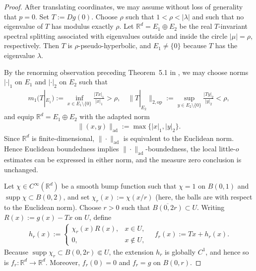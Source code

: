 \documentclass{article}
\begin{document}
\begin{proof}
After translating coordinates, we may assume without loss of generality that
$p=0$. Set $T:=Dg(0)$. Choose $\rho$ such that $1<\rho<|\lambda|$ and such
that no eigenvalue of $T$ has modulus exactly $\rho$. Let
$\mathbb R^d=E_1\oplus E_2$ be the real $T$-invariant spectral splitting
associated with eigenvalues outside and inside the circle $|\mu|=\rho$,
respectively. Then $T$ is $\rho$-pseudo-hyperbolic, and
$E_1\neq\{0\}$ because $T$ has the eigenvalue $\lambda$.

By the renorming observation preceding Theorem~5.1 in
\citet[p.~53]{hirsch1977invariant}, we may choose norms $|\cdot|_1$ on $E_1$
and $|\cdot|_2$ on $E_2$ such that
\begin{align}
    m_1(T|_{E_1})
    :={}
    \inf_{x\in E_1\setminus\{0\}}
    \frac{|Tx|_1}{|x|_1}
    >\rho,\quad
    \|T|_{E_2}\|_{2,\mathrm{op}}
    :={}
    \sup_{y\in E_2\setminus\{0\}}
    \frac{|Ty|_2}{|y|_2}
    <\rho,
\end{align}
and equip $\mathbb R^d=E_1\oplus E_2$ with the adapted norm
\begin{align}
    \|(x,y)\|_{\mathrm{ad}}
    :=
    \max\{|x|_1,|y|_2\}.
\end{align}
Since $\mathbb R^d$ is finite-dimensional, $\|\cdot\|_{\mathrm{ad}}$ is
equivalent to the Euclidean norm. Hence Euclidean boundedness implies
$\|\cdot\|_{\mathrm{ad}}$-boundedness, the local little-$o$ estimates can be
expressed in either norm, and the measure zero conclusion is unchanged.

Let $\chi\in C^\infty(\mathbb R^d)$ be a smooth bump function such that $\chi=1$ on $B(0,1)$
and $\operatorname{supp}\chi\subset B(0,2)$, and set
$\chi_r(x):=\chi(x/r)$ (here, the balls are with respect to the Euclidean norm). Choose $r>0$ such that
$\overline{B(0,2r)}\subset U$. Writing $R(x):=g(x)-Tx$ on $U$, define
\begin{align}
    h_r(x)
    :={}
    \begin{cases}
        \chi_r(x)R(x), & x\in U,\\
        0, & x\notin U,
    \end{cases}
    \quad
    f_r(x):=Tx+h_r(x).
\end{align}
Because $\operatorname{supp}\chi_r\subset B(0,2r)\Subset U$, the extension
$h_r$ is globally $C^1$, and hence so is $f_r:\mathbb R^d\to\mathbb R^d$.
Moreover, $f_r(0)=0$ and $f_r=g$ on $B(0,r)$.


\end{proof}
\end{document}
